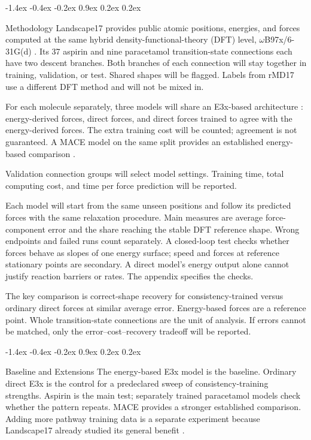 \documentclass{article}
\makeatletter
\renewcommand{\section}{\@startsection{section}{1}{\z@}%
  {-1.4ex \@plus -0.4ex \@minus -0.2ex}%
  {0.9ex \@plus 0.2ex \@minus 0.2ex}%
  {\large\bf\raggedright}}
\makeatother
\begin{document}
\section{Methodology}
Landscape17 provides public atomic positions, energies, and forces computed at the same hybrid density-functional-theory (DFT) level, $\omega$B97x/6-31G(d) \cite{landscape}. Its 37 aspirin and nine paracetamol transition-state connections each have two descent branches. Both branches of each connection will stay together in training, validation, or test. Shared shapes will be flagged. Labels from rMD17 use a different DFT method and will not be mixed in.

For each molecule separately, three models will share an E3x-based architecture \cite{e3x}: energy-derived forces, direct forces, and direct forces trained to agree with the energy-derived forces. The extra training cost will be counted; agreement is not guaranteed. A MACE model on the same split provides an established energy-based comparison \cite{mace}.

Validation connection groups will select model settings. Training time, total computing cost, and time per force prediction will be reported.

Each model will start from the same unseen positions and follow its predicted forces with the same relaxation procedure. Main measures are average force-component error and the share reaching the stable DFT reference shape. Wrong endpoints and failed runs count separately. A closed-loop test checks whether forces behave as slopes of one energy surface; speed and forces at reference stationary points are secondary. A direct model's energy output alone cannot justify reaction barriers or rates. The appendix specifies the checks.

The key comparison is correct-shape recovery for consistency-trained versus ordinary direct forces at similar average error. Energy-based forces are a reference point. Whole transition-state connections are the unit of analysis. If errors cannot be matched, only the error--cost--recovery tradeoff will be reported.

\section{Baseline and Extensions}
The energy-based E3x model is the baseline. Ordinary direct E3x is the control for a predeclared sweep of consistency-training strengths. Aspirin is the main test; separately trained paracetamol models check whether the pattern repeats. MACE provides a stronger established comparison. Adding more pathway training data is a separate experiment because Landscape17 already studied its general benefit \cite{landscape}.
\end{document}
